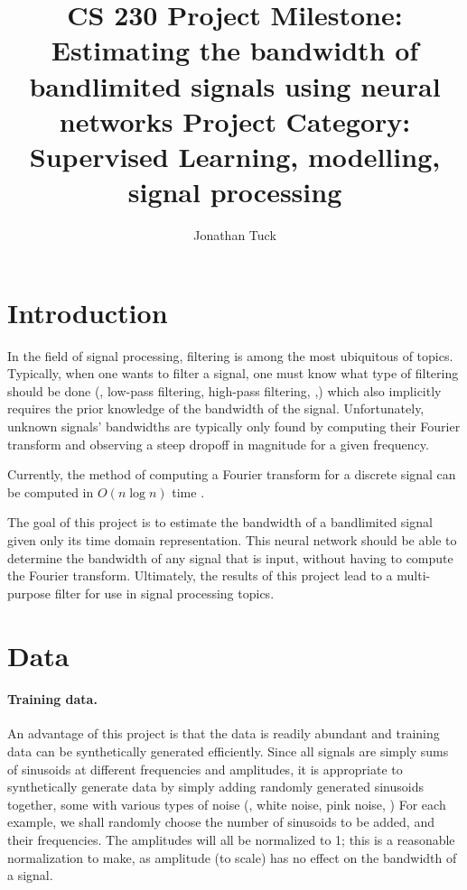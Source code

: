 \documentclass[12pt]{article}
\title{
CS 230 Project Milestone: Estimating the bandwidth of bandlimited signals using neural networks
\newline 
\newline
Project Category: Supervised Learning, modelling, signal processing
}
\author{Jonathan Tuck}
\begin{document}
\maketitle

\newpage
\tableofcontents
\newpage

\section{Introduction}
In the field of signal processing, filtering is among the most ubiquitous of topics.
Typically, when one wants to filter a signal, one must know what type of filtering should be done
(\ie, low-pass filtering, high-pass filtering, \etc,) which also implicitly
requires the prior knowledge of the bandwidth of the signal. Unfortunately, unknown
signals' bandwidths are typically only found by computing their Fourier transform and observing
a steep dropoff in magnitude for a given frequency. 


Currently, the method of computing a Fourier transform
for a discrete signal can be computed in $O(n \log n)$ time \cite{B:78,O:17}.

The goal of this project is to estimate the bandwidth of a bandlimited signal given only its time domain
representation. This neural network should be able to determine the bandwidth of any signal that is input, 
without having to compute the Fourier transform. Ultimately, the results of this project lead to a 
multi-purpose filter for use in signal processing topics. 

\section{Data}
\paragraph{Training data.} An advantage of this project is that the data is readily abundant and 
training data can be synthetically generated efficiently. Since all signals are simply sums of 
sinusoids at different frequencies and amplitudes, it is appropriate to synthetically generate
data by simply adding randomly generated sinusoids together, some with various types of noise 
(\eg, white noise, pink noise, \etc) For each example, we shall randomly choose the number of sinusoids 
to be added, and their frequencies. The amplitudes will all be normalized to 1; this is a reasonable 
normalization to make, as amplitude (to scale) has no effect on the bandwidth of a signal.
\end{document}

